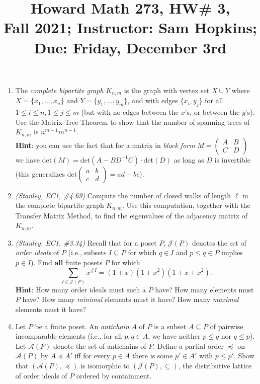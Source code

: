 \documentclass[11pt]{article}
\title{Howard Math 273, HW\# 3, \\ {\normalsize Fall 2021; Instructor: Sam Hopkins; Due: Friday, December 3rd}}
\date{}
\begin{document}
\maketitle

\thispagestyle{empty}

\vspace{-1cm}

\begin{enumerate}

\item The \emph{complete bipartite graph $K_{n,m}$} is the graph with vertex set $X\cup Y$ where $X=\{x_1,...,x_n\}$ and $Y=\{y_1,...,y_m\}$, and with edges $\{x_i,y_j\}$ for all $1\leq i \leq n, 1\leq j \leq m$ (but with no edges between the $x$'s, or between the $y$'s). Use the Matrix-Tree Theorem to show that the number of spanning trees of $K_{n,m}$ is $n^{m-1}m^{n-1}$. \\
{\bf Hint}: you can use the fact that for a matrix in \emph{block form} $M=\begin{pmatrix} A & B \\ C & D \end{pmatrix}$ we have $\mathrm{det}(M) = \mathrm{det}(A-BD^{-1}C)\cdot\mathrm{det}(D)$ as long as $D$ is invertible (this generalizes $\mathrm{det}\begin{pmatrix} a & b \\ c & d\end{pmatrix}=ad-bc$).

\item  \emph{(Stanley, EC1, \#4.69)} Compute the number of closed walks of length $\ell$ in the complete bipartite graph $K_{n,m}$. Use this computation, together with the Transfer Matrix Method, to find the eigenvalues of the adjacency matrix of $K_{n,m}$.

\item \emph{(Stanley, EC1, \#3.34)} Recall that for a poset $P$, $\mathcal{J}(P)$ denotes the set of \emph{order ideals} of $P$ (i.e., subsets $I\subseteq P$ for which $q\in I$ and $p\leq q\in P$ implies $p\in I$). Find {\bf all} finite posets $P$ for which
\[ \sum_{I \in \mathcal{J}(P)} x^{\#I} = (1+x)(1+x^2)(1+x+x^2).\]
{\bf Hint}: How many order ideals must such a $P$ have? How many elements must $P$ have? How many \emph{minimal} elements must it have? How many \emph{maximal} elements must it have?

\item Let $P$ be a finite poset. An \emph{antichain} $A$ of $P$ is a subset $A\subseteq P$ of pairwise incomparable elements (i.e., for all $p,q\in A$, we have neither $p\leq q$ nor $q \leq p$). Let $\mathcal{A}(P)$ denote the set of antichains of $P$. Define a partial order $\preceq$ on $\mathcal{A}(P)$ by $A \preceq A'$ iff for every $p \in A$ there is some $p'\in A'$ with $p \leq p'$. Show that $(\mathcal{A}(P),\preceq)$ is isomorphic to $(\mathcal{J}(P),\subseteq)$, the distributive lattice of order ideals of $P$ ordered by containment.


\end{enumerate}
\end{document}
